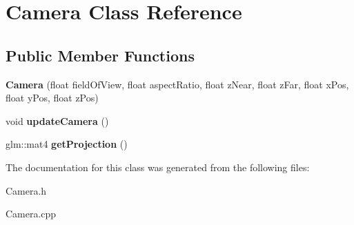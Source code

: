 \hypertarget{class_camera}{}\section{Camera Class Reference}
\label{class_camera}
\subsection*{Public Member Functions}
\begin{DoxyCompactItemize}
\item 
\hypertarget{class_camera_a58e5645c8597e4835aa55efdb289a7db}{}\label{class_camera_a58e5645c8597e4835aa55efdb289a7db} 
{\bfseries Camera} (float field\+Of\+View, float aspect\+Ratio, float z\+Near, float z\+Far, float x\+Pos, float y\+Pos, float z\+Pos)
\item 
\hypertarget{class_camera_aa67fdde5001bb777ad917c3a1a40fd60}{}\label{class_camera_aa67fdde5001bb777ad917c3a1a40fd60} 
void {\bfseries update\+Camera} ()
\item 
\hypertarget{class_camera_ad97a8d5eab9961181e7d96315f5938c6}{}\label{class_camera_ad97a8d5eab9961181e7d96315f5938c6} 
glm\+::mat4 {\bfseries get\+Projection} ()
\end{DoxyCompactItemize}


The documentation for this class was generated from the following files\+:\begin{DoxyCompactItemize}
\item 
Camera.\+h\item 
Camera.\+cpp\end{DoxyCompactItemize}
